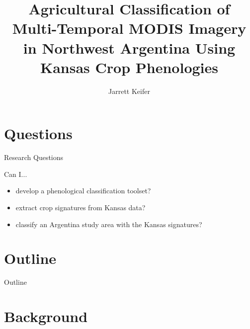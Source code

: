 \documentclass[draft,compress]{beamer}
\title{Agricultural Classification of Multi-Temporal MODIS Imagery in Northwest Argentina Using Kansas Crop Phenologies}
\subtitle{}
\date{\formatdate{17}{9}{2014}}
\author{Jarrett Keifer}
\institute{Department of Geography}%
\begin{document}

\maketitle



\section*{Questions}

\begin{frame}{Research Questions}

Can I...

\begin{itemize}
  \item<1-> develop a phenological classification toolset?
  \item<2-> extract crop signatures from Kansas data?
  \item<3-> classify an Argentina study area with the Kansas signatures?
\end{itemize}
\end{frame}


\section*{Outline}
\begin{frame}{Outline}
	\singlespace\tableofcontents[hideallsubsections]
\end{frame}



\section{Background}
\end{document}
